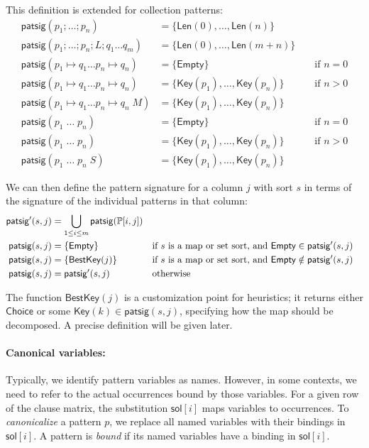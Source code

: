 \documentclass{article}
\theoremstyle{definition}
\newcommand{\listcst}{\mathsf{Len}}
\newcommand{\emptymap}{\mathsf{Empty}}
\newcommand{\mapkey}{\mathsf{Key}}
\newcommand{\mapchoice}{\mathsf{Choice}}
\newcommand{\sol}{\mathsf{sol}}
\newcommand{\PP}{\mathbb{P}}
\newcommand{\bestkey}{\mathsf{BestKey}}
\newcommand{\patsig}{\mathsf{patsig}}
\begin{document}
This definition is extended for collection patterns:
\begin{align*}
  \patsig(p_1 ; \dots ; p_n) & = \{\listcst(0), \dots, \listcst(n)\} \\
  \patsig(p_1 ; \dots ; p_n; L; q_1 \dots q_m) & = \{\listcst(0), \dots, \listcst(m+n)\} \\
  \patsig(p_1 \mapsto q_1 \dots p_n \mapsto q_n) & = \{\emptymap\} && \text{ if } n = 0 \\
  \patsig(p_1 \mapsto q_1 \dots p_n \mapsto q_n) & = \{\mapkey(p_1), \dots, \mapkey(p_n)\} && \text{ if } n > 0 \\
  \patsig(p_1 \mapsto q_1 \dots p_n \mapsto q_n \; M) & = \{\mapkey(p_1), \dots, \mapkey(p_n)\} \\
  \patsig(p_1 \; \dots \; p_n) & = \{\emptymap\} && \text{ if } n = 0 \\
  \patsig(p_1 \; \dots \; p_n) & = \{\mapkey(p_1), \dots, \mapkey(p_n)\} && \text{ if } n > 0 \\
  \patsig(p_1 \; \dots \; p_n \; S) & = \{\mapkey(p_1), \dots, \mapkey(p_n)\}
\end{align*}

We can then define the pattern signature for a column $ j $ with sort $ s $ in
terms of the signature of the individual patterns in that column:
\begin{align*}
  \patsig'(s, j) & = \bigcup_{1 \leq i \leq m} \patsig(\PP[i, j]) \\
  \patsig(s, j)  & = \{ \emptymap \}
                 && \text{if $ s $ is a map or set sort, and $ \emptymap \in \patsig'(s, j)$} \\
  \patsig(s, j)  & = \{ \bestkey(j) \}
                 && \text{if $ s $ is a map or set sort, and $ \emptymap \notin \patsig'(s, j)$} \\
  \patsig(s, j)  & = \patsig'(s, j)
                 && \text{otherwise}
\end{align*}

The function $ \bestkey(j) $ is a customization point for heuristics; it returns
either $ \mapchoice $ or some $ \mapkey(k) \in \patsig(s, j) $, specifying how
the map should be decomposed. A precise definition will be given later.

\paragraph{Canonical variables:}

Typically, we identify pattern variables as names. However, in some contexts, we
need to refer to the actual occurrences bound by those variables. For a given
row of the clause matrix, the substitution $ \sol[i] $ maps variables to
occurrences. To \emph{canonicalize} a pattern $ p $, we replace all named
variables with their bindings in $ \sol[i] $. A pattern is \emph{bound} if its
named variables have a binding in $ \sol[i] $.
\end{document}
